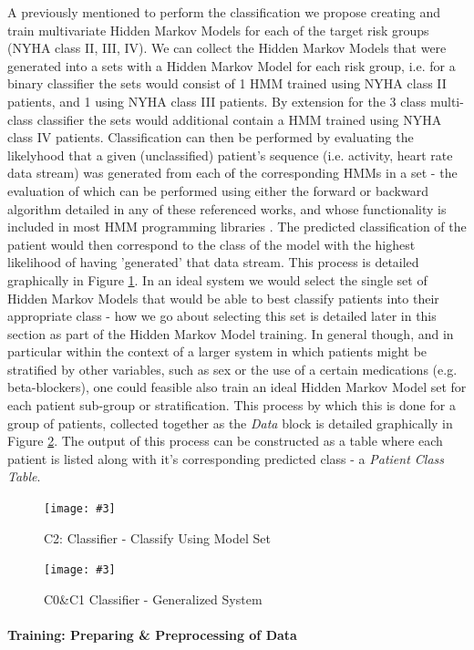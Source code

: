 \documentclass[]{article}
\newcommand\landscapeFigure[4]{
	\newgeometry{left=#1,right=#1,top=#1}
	\begin{landscape}
		\begin{figure}
			\centering
			\texttt{[image: \#3]}
			\caption{#2}
			\label{#4}
		\end{figure}
	\end{landscape}
	\restoregeometry
}
\begin{document}
A previously mentioned to perform the classification we propose creating and train multivariate Hidden Markov Models for each of the target risk groups (NYHA class II, III, IV). We can collect the Hidden Markov Models that were generated into a sets with a Hidden Markov Model for each risk group, i.e. for a binary classifier the sets would consist of 1 HMM trained using NYHA class II patients, and 1 using NYHA class III patients. By extension for the 3 class multi-class classifier the sets would additional contain a HMM trained using NYHA class IV patients. Classification can then be performed by evaluating the likelyhood that a given (unclassified) patient's sequence (i.e. activity, heart rate data stream) was generated from each of the corresponding HMMs in a set - the evaluation of which can be performed using either the forward or backward algorithm detailed in any of these referenced works, and whose functionality is included in most HMM programming libraries \cite{Jurafsky2017,Bobick2015a,Gagniuc2017,OConnell2011,Rabiner1989}. The predicted classification of the patient would then correspond to the class of the model with the highest likelihood of having 'generated' that data stream. This process is detailed graphically in Figure \ref{fig:C2}. In an ideal system we would select the single set of Hidden Markov Models that would be able to best classify patients into their appropriate class - how we go about selecting this set is detailed later in this section as part of the Hidden Markov Model training. In general though, and in particular within the context of a larger system in which patients might be stratified by other variables, such as sex or the use of a certain medications (e.g. beta-blockers), one could feasible also train an ideal Hidden Markov Model set for each patient sub-group or stratification. This process by which this is done for a group of patients, collected together as the \textit{Data} block is detailed graphically in Figure \ref{fig:C0C1}. The output of this process can be constructed as a table where each patient is listed along with it's corresponding predicted class - a \textit{Patient Class Table}.

\landscapeFigure{1cm}{C2: Classifier - Classify Using Model Set}{../modelDevelopmentFlowcharts/C2-Classifier_Classify_Using_Model_Set.png}{fig:C2}

\landscapeFigure{1cm}{C0\&C1 Classifier - Generalized System}{../modelDevelopmentFlowcharts/C0&C1-Classifier_Overview.png}{fig:C0C1}


\paragraph{Training: Preparing \& Preprocessing of Data}
\end{document}
